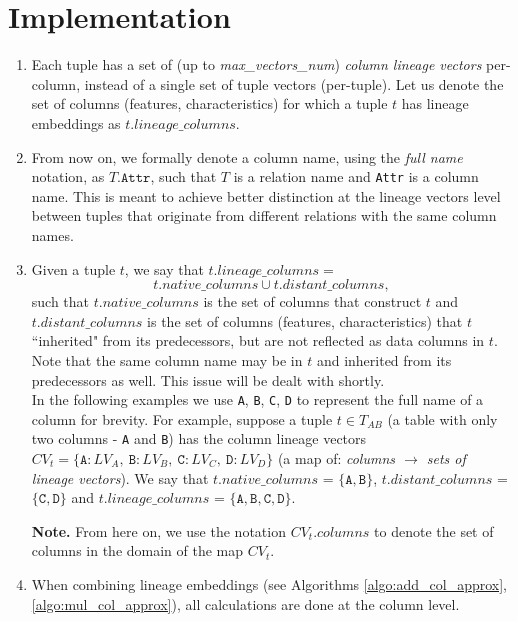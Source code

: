 \section{Implementation} 
\begin{enumerate}
    \item Each tuple has a set of (up to \textit{max\_vectors\_num}) \textit{column lineage vectors} per-column, instead of a single set of tuple vectors (per-tuple). Let us denote the set of columns (features, characteristics) for which a tuple $t$ has lineage embeddings as $t.lineage\_columns$.
    \item From now on, we formally denote a column name, using the \textit{full name} notation, as $T.\texttt{Attr}$, such that $T$ is a relation name and \texttt{Attr} is a column name. This is meant to achieve better distinction at the lineage vectors level between tuples that originate from different relations with the same column names. 
    \item Given a tuple $t$, we say that $t.lineage\_columns = $
        \begin{equation*}
            t.native\_columns \cup t.distant\_columns,
        \end{equation*}
    such that $t.native\_columns$ is the set of columns that construct $t$ and $t.distant\_columns$ is the set of columns (features, characteristics) that $t$ ``inherited" from its predecessors, but are not reflected as data columns in $t$.
    Note that the same column name may be in $t$ and inherited from its predecessors as well. This issue will be dealt with shortly.\\
    In the following examples we use \texttt{A}, \texttt{B}, \texttt{C}, \texttt{D} to represent the full name of a column for brevity. For example, suppose a tuple $t \in T_{AB}$ (a table with only two columns - \texttt{A} and \texttt{B}) has the column lineage vectors $CV_t = \{\texttt{A}\!: LV_A,\: \texttt{B}\!: LV_B,\: \texttt{C}\!: LV_C,\: \texttt{D}\!: LV_D\}$ (a map of: \textit{columns $\rightarrow$ sets of lineage vectors}). We say that $t.native\_columns$ = $\{\texttt{A}, \texttt{B}\}$, $t.distant\_columns$ = $\{\texttt{C}, \texttt{D}\}$ and $t.lineage\_columns$ = $\{\texttt{A}, \texttt{B}, \texttt{C}, \texttt{D}\}$.\\
    \par\textbf{Note.} From here on, we use the notation $CV_t.columns$ to denote the set of columns in the domain of the map $CV_t$.
    \item When combining lineage embeddings (see Algorithms \ref{algo:add_col_approx},\ref{algo:mul_col_approx}), all calculations are done at the column level.

\end{enumerate}
